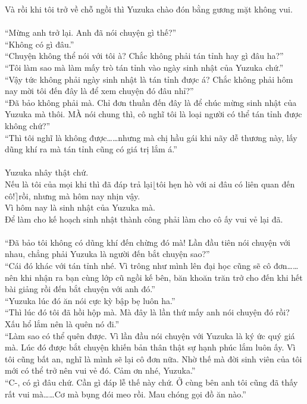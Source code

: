 \documentclass[12pt,a4paper, twosides]{book}
\begin{document}
Và rồi khi tôi trở về chỗ ngồi thì Yuzuka chào đón bằng gương mặt không vui.\\
\\
“Mừng anh trở lại. Anh đã nói chuyện gì thế?”\\
“Không có gì đâu.”\\
“Chuyện không thể nói với tôi à? Chắc không phải tán tỉnh hay gì đâu ha?”\\
“Tôi làm sao mà làm mấy trò tán tỉnh vào ngày sinh nhật của Yuzuka chứ.”\\
“Vậy tức không phải ngày sinh nhật là tán tỉnh được á? Chắc không phải hôm nay mời tôi đến đây là để xem chuyện đó đâu nhỉ?”\\
“Đã bảo không phải mà. Chỉ đơn thuần đến đây là để chúc mừng sinh nhật của Yuzuka mà thôi. MÀ nói chung thì, cô nghĩ tôi là loại người có thể tán tỉnh được không chứ?”\\
“Thì tôi nghĩ là không được……nhưng mà chị hầu gái khi nãy dễ thương này, lấy dũng khí ra mà tán tỉnh cũng có giá trị lắm á.”\\
\\
Yuzuka nhây thật chứ.\\
Nếu là tôi của mọi khi thì đã đáp trả lại$\lfloor$tôi hẹn hò với ai đâu có liên quan đến cô!$\rceil$rồi, nhưng mà hôm nay nhịn vậy.\\
Vì hôm nay là sinh nhật của Yuzuka mà.\\
Để làm cho kế hoạch sinh nhật thành công phải làm cho cô ấy vui vẻ lại đã.\\
\\
“Đã bảo tôi không có dũng khí đến chừng đó mà! Lần đầu tiên nói chuyện với nhau, chẳng phải Yuzuka là người đến bắt chuyện sao?”\\
“Cái đó khác với tán tỉnh nhé. Vì trông như mình lên đại học cũng sẽ cô đơn……nên khi nhận ra bạn cùng lớp cũ ngồi kế bên, băn khoăn trăn trở cho đến khi hết bài giảng rồi đến bắt chuyện với anh đó.”\\
“Yuzuka lúc đó ăn nói cực kỳ bập bẹ luôn ha.”\\
“Thì lúc đó tôi đã hồi hộp mà. Mà đây là lần thứ mấy anh nói chuyện đó rồi? Xấu hổ lắm nên là quên nó đi.”\\
“Làm sao có thể quên được. Vì lần đầu nói chuyện với Yuzuka là ký ức quý giá mà. Lúc đó được bắt chuyện khiến bản thân thật sự hạnh phúc lắm luôn ấy. Vì tôi cũng bất an, nghĩ là mình sẽ lại cô đơn nữa. Nhờ thế mà đời sinh viên của tôi mới có thể trở nên vui vẻ đó. Cảm ơn nhé, Yuzuka.”\\
“C-, có gì đâu chứ. Cần gì đáp lễ thế này chứ. Ở cùng bên anh tôi cũng đã thấy rất vui mà……Cơ mà bụng đói meo rồi. Mau chóng gọi đồ ăn nào.”\\
\end{document}
